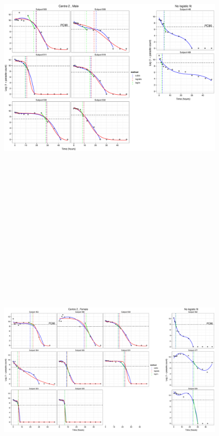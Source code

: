 \begin{figure}
\includegraphics[height=150mm]{Afits2M.eps}
\end{figure}
\begin{figure}
\includegraphics[height=150mm]{Afits2F.eps}
\end{figure}
